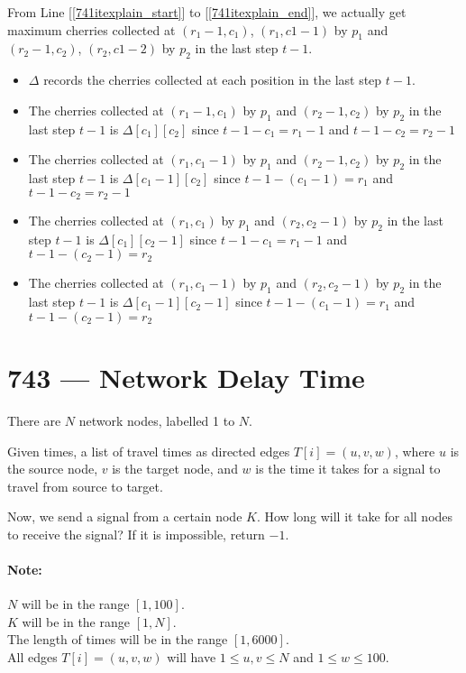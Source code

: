 From Line [\ref{741itexplain_start}] to [\ref{741itexplain_end}], we actually get maximum cherries collected at $(r_1-1,c_1)$, $(r_1,c1-1)$ by $p_1$ and $(r_2-1,c_2)$, $(r_2,c1-2)$ by $p_2$ in the last step $t-1$.
\begin{itemize}
    \item $\Delta$ records the cherries collected at each position in the last step $t-1$.
    \item The cherries collected at $(r_1-1, c_1)$ by $p_1$ and $(r_2-1, c_2)$ by $p_2$ in the last step $t- 1$ is $\Delta[c_1][c_2]$ since $t-1-c_1 = r_1-1$ and $t-1-c_2 = r_2-1$
    \item The cherries collected at $(r_1, c_1-1)$ by $p_1$ and $(r_2-1, c_2)$ by $p_2$ in the last step $t- 1$ is $\Delta[c_1-1][c_2]$ since $t-1-(c_1-1) = r_1$ and $t-1-c_2 = r_2-1$
    \item The cherries collected at $(r_1, c_1)$ by $p_1$ and $(r_2, c_2-1)$ by $p_2$ in the last step $t- 1$ is $\Delta[c_1][c_2-1]$ since $t-1-c_1 = r_1-1$ and $t-1-(c_2-1) = r_2$
    \item The cherries collected at $(r_1, c_1-1)$ by $p_1$ and $(r_2, c_2-1)$ by $p_2$ in the last step $t- 1$ is $\Delta[c_1-1][c_2-1]$ since $t-1-(c_1-1) = r_1$ and $t-1-(c_2-1) = r_2$
\end{itemize}

\section{743 --- Network Delay Time}
There are $N$ network nodes, labelled 1 to $N$.
\par
Given times, a list of travel times as directed edges $T[i] = (u, v, w)$, where $u$ is the source node, $v$ is the target node, and $w$ is the time it takes for a signal to travel from source to target.
\par
Now, we send a signal from a certain node $K$. How long will it take for all nodes to receive the signal? If it is impossible, return $-1$.
\paragraph{Note:}
\begin{flushleft}
$N$ will be in the range $[1, 100]$.
\\
$K$ will be in the range $[1, N]$.
\\
The length of times will be in the range $[1, 6000]$.
\\
All edges $T[i] = (u, v, w)$ will have $1 \leq u, v \leq N$ and $1 \leq w \leq 100$.
\end{flushleft}
